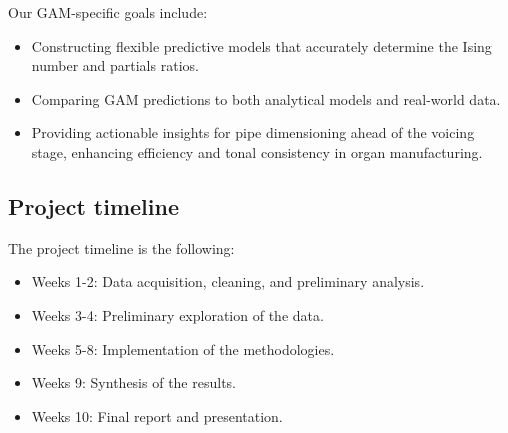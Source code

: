 \documentclass{psu-plan}
\begin{document}
Our GAM-specific goals include:
\begin{itemize}
    \item Constructing flexible predictive models that accurately determine the Ising number and partials ratios.
 \item Comparing GAM predictions to both analytical models and real-world data.
 \item Providing actionable insights for pipe dimensioning ahead of the voicing stage, enhancing efficiency 
    and tonal consistency in organ manufacturing.
\end{itemize}

\subsection{Project timeline}

The project timeline is the following:
\begin{itemize}
    \item Weeks 1-2: Data acquisition, cleaning, and preliminary analysis.
    \item Weeks 3-4: Preliminary exploration of the data.
    \item Weeks 5-8: Implementation of the methodologies.
    \item Weeks 9: Synthesis of the results.
    \item Weeks 10: Final report and presentation.
\end{itemize}

\nocite{*} %
\printbibliography[heading=bibintoc,title=Bibliography]
\end{document}
